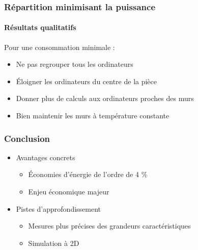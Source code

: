 \documentclass[a4paper,11pt]{beamer}
\begin{document}
\begin{frame}
    \frametitle{Répartition minimisant la puissance}
    \framesubtitle{Résultats qualitatifs}

    Pour une consommation minimale :
    \begin{itemize}
        \item Ne pas regrouper tous les ordinateurs
        \item Éloigner les ordinateurs du centre de la pièce
        \item Donner plus de calculs aux ordinateurs proches des murs
        \item Bien maintenir les murs à température constante
    \end{itemize}
\end{frame}

\begin{frame}
    \frametitle{Conclusion}

    \begin{itemize}
        \item Avantages concrets
        \begin{itemize}
            \item Économies d'énergie de l'ordre de 4 \%
            \item Enjeu économique majeur
        \end{itemize}
        \item Pistes d'approfondissement
        \begin{itemize}
            \item Mesures plus précises des grandeurs caractéristiques
            \item Simulation à 2D
        \end{itemize}
    \end{itemize}
\end{frame}
\end{document}
